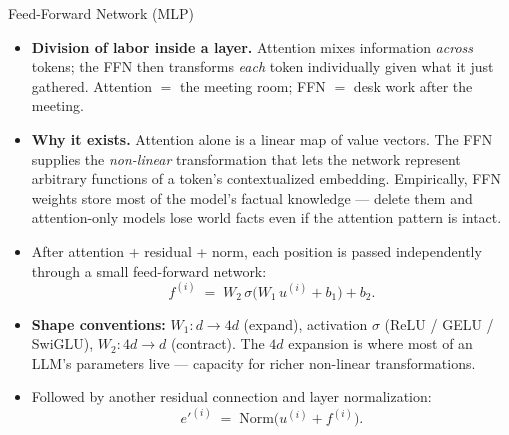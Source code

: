 \documentclass[10pt,english,aspectratio=169]{beamer}
\begin{document}
\begin{frame}{Feed-Forward Network (MLP)}
\begin{itemize}
\item \textbf{Division of labor inside a layer.} Attention mixes information \emph{across} tokens; the FFN then transforms \emph{each} token individually given what it just gathered. Attention $=$ the meeting room; FFN $=$ desk work after the meeting.

\medskip
\item \textbf{Why it exists.} Attention alone is a linear map of value vectors. The FFN supplies the \emph{non-linear} transformation that lets the network represent arbitrary functions of a token's contextualized embedding. Empirically, FFN weights store most of the model's factual knowledge --- delete them and attention-only models lose world facts even if the attention pattern is intact.

\medskip
\item After attention + residual + norm, each position is passed independently through a small feed-forward network:
\[
   f^{(i)} \;=\; W_{2}\,\sigma\bigl(W_{1}\,u^{(i)} + b_{1}\bigr) + b_{2}.
\]

\medskip
\item \textbf{Shape conventions:} $W_{1}\colon d \!\rightarrow\! 4d$ (expand), activation $\sigma$ (ReLU / GELU / SwiGLU), $W_{2}\colon 4d \!\rightarrow\! d$ (contract). The $4d$ expansion is where most of an LLM's parameters live --- capacity for richer non-linear transformations.

\medskip
\item Followed by another residual connection and layer normalization:
\[
   e'^{(i)} \;=\; \mathrm{Norm}\bigl(u^{(i)} + f^{(i)}\bigr).
\]
\end{itemize}
\end{frame}
\end{document}
